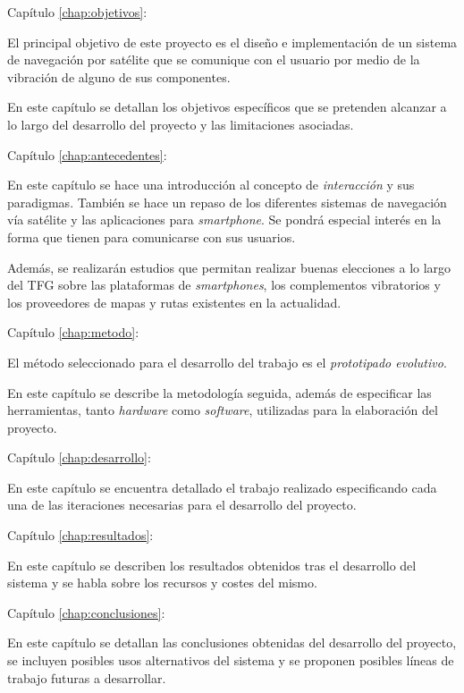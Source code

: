\begin{definitionlist}
  \item[Capítulo \ref{chap:objetivos}: \nameref{chap:objetivos}] 

  El principal objetivo de este proyecto es el diseño e implementación de un sistema de navegación
  por satélite que se comunique con el usuario por medio de la vibración de alguno de sus
  componentes.

  En este capítulo se detallan los objetivos específicos que se pretenden alcanzar a lo largo
  del desarrollo del proyecto y las limitaciones asociadas.

  \item[Capítulo \ref{chap:antecedentes}: \nameref{chap:antecedentes}]

  En este capítulo se hace una introducción al concepto de \emph{interacción} y sus
  paradigmas. También se hace un repaso de los diferentes sistemas de navegación vía satélite y las
  aplicaciones para \emph{smartphone}. Se pondrá especial interés en la forma que tienen para
  comunicarse con sus usuarios.

  Además, se realizarán estudios que permitan realizar buenas elecciones a lo largo del
  \acs{TFG} sobre las plataformas de \emph{smartphones}, los complementos vibratorios y los
  proveedores de mapas y rutas existentes en la actualidad.

  \item[Capítulo \ref{chap:metodo}: \nameref{chap:metodo}]

  El método seleccionado para el desarrollo del trabajo es el \emph{prototipado evolutivo}.

  En este capítulo se describe la metodología seguida, además de especificar las herramientas, tanto
  \emph{hardware} como \emph{software}, utilizadas para la elaboración del proyecto.\\

  \item[Capítulo \ref{chap:desarrollo}: \nameref{chap:desarrollo}]

  En este capítulo se encuentra detallado el trabajo realizado especificando cada una de las
  iteraciones necesarias para el desarrollo del proyecto.

  \item[Capítulo \ref{chap:resultados}: \nameref{chap:resultados}]

  En este capítulo se describen los resultados obtenidos tras el desarrollo del sistema y se habla
  sobre los recursos y costes del mismo.

  \item[Capítulo \ref{chap:conclusiones}: \nameref{chap:conclusiones}]

  En este capítulo se detallan las conclusiones obtenidas del desarrollo del proyecto, se
  incluyen posibles usos alternativos del sistema y se proponen posibles líneas de trabajo
  futuras a desarrollar.

\end{definitionlist}

